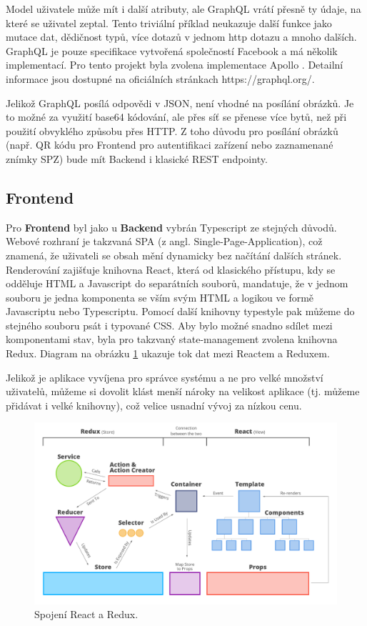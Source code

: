 Model uživatele může mít i další atributy, ale GraphQL vrátí přesně ty údaje, na které se uživatel zeptal.
Tento triviální příklad neukazuje další funkce jako mutace dat, dědičnost typů, více dotazů v jednom http dotazu
a mnoho dalších.
GraphQL je pouze specifikace vytvořená společností Facebook a má několik
implementací. Pro tento projekt byla zvolena implementace Apollo \citep[viz][]{Apollo}. Detailní informace jsou dostupné na oficiálních
stránkach https://graphql.org/.

Jelikož GraphQL posílá odpovědi v JSON, není vhodné na posílání obrázků. Je to možné za využití base64 kódování,
ale přes síť se přenese více bytů, než při použití obvyklého způsobu přes HTTP. Z toho důvodu pro posílání
obrázků (např. QR kódu pro Frontend pro autentifikaci zařízení nebo zaznamenané znímky SPZ) bude mít Backend i
klasické REST endpointy.

\subsection{Frontend} \label{frontend}

Pro \textbf{Frontend} byl jako u \textbf{Backend} vybrán Typescript ze stejných důvodů. Webové rozhraní
je takzvaná SPA (z angl. Single-Page-Application), což znamená, že uživateli se obsah mění dynamicky
bez načítání dalších stránek.
Renderování zajišťuje knihovna React, která od klasického přístupu, kdy se odděluje HTML a Javascript do separátních
souborů, mandatuje, že v jednom souboru je jedna komponenta se vším svým HTML a logikou ve formě Javascriptu nebo
Typescriptu. Pomocí další knihovny typestyle pak můžeme do stejného souboru psát i typované CSS.
Aby bylo možné snadno sdílet mezi komponentami stav, byla pro takzvaný state-management zvolena knihovna Redux.
Diagram na obrázku \ref{fig:react_redux_dataflow} ukazuje tok dat mezi Reactem a Reduxem.

Jelikož je aplikace vyvíjena pro správce systému a ne pro velké množství uživatelů, můžeme si dovolit
klást menší nároky na velikost aplikace (tj. můžeme přidávat i velké knihovny), což velice usnadní vývoj za
nízkou cenu.

\begin{figure}[!htb] \centering
\includegraphics[width=145mm]{../img/react-redux-architecture.png}
\caption{Spojení React a Redux. \citep[viz][]{react_redux_dataflow}}
\label{fig:react_redux_dataflow}
\end{figure}

